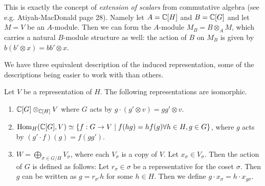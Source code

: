 \documentclass[11pt, english]{article}
\begin{document}
\begin{remark}
This is exactly the concept of \emph{extension of scalars} from commutative algebra (see e.g. Atiyah-MacDonald page 28). Namely let $A=\mathbb{C}[H]$ and $B=\mathbb{C}[G]$ and let $M=V$ be an $A$-module. Then we can form the $A$-module $M_B= B \otimes_A M$, which carries a natural $B$-module structure as well: the action of $B$ on $M_B$ is given by $b(b' \otimes x)=bb' \otimes x$.
\end{remark}

We have three equivalent description of the induced representation, some of the descriptions being easier to work with than others.

\begin{thm}
Let $V$ be a representation of $H$. The following representations are isomorphic.
\begin{enumerate}
\item $\mathbb{C}[G] \otimes_{\mathbb{C}[H]} V$ where $G$ acts by $g \cdot (g' \otimes v) = gg' \otimes v$. 
\item $\operatorname{Hom}_H(\mathbb{C}[G],V) \simeq \{ f:G \to V \mid f(hg)=hf(g) \forall h \in H, g \in G \}$, where $g$ acts by $(g' \cdot f)(g) = f(gg')$.
\item $W = \bigoplus_{\sigma \in G/H} V_\sigma$, where each $V_\sigma$ is a copy of $V$. Let $x_\sigma \in V_\sigma$. Then the action of $G$ is defined as follows: Let $r_\sigma \in \sigma$ be a representative for the coset $\sigma$. Then $g$ can be written as $g=r_{\sigma'}h$ for some $h \in H$. Then we define $g \cdot  x_\sigma = h \cdot x_{g \sigma}$.
\end{enumerate}
\end{thm}
\end{document}
